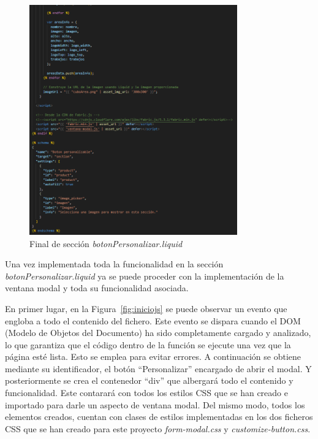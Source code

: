 \documentclass[12pt]{article}
\begin{document}
\begin{figure}[ht]
    \centering
    \includegraphics[width=0.8\textwidth]{imagenesUS3-section/finalSeccion.png}
    \caption{\label{fig:finalSeccion} Final de sección \textit{botonPersonalizar.liquid}}
    \vspace{\fill}
\end{figure}

Una vez implementada toda la funcionalidad en la sección \textit{botonPersonalizar.liquid} ya se puede proceder con la implementación de la ventana
modal y toda su funcionalidad asociada.

En primer lugar, en la Figura~\ref{fig:iniciojs} se puede observar un evento que engloba a todo el contenido del fichero. Este evento se dispara cuando el DOM (Modelo de Objetos del Documento) ha 
sido completamente cargado y analizado, lo que garantiza que el código dentro de la función se ejecute una vez que la página esté lista. Esto se emplea para evitar errores.
A continuación se obtiene mediante su identificador, el botón ``Personalizar'' encargado de abrir el modal. Y posteriormente se crea el contenedor ``div'' que albergará 
todo el contenido y funcionalidad. Este contarará con todos los estilos CSS que se han creado e importado para darle un aspecto de ventana modal. Del mismo modo, todos los elementos
creados, cuentan con clases de estilos implementadas en los dos ficheros CSS que se han creado para este proyecto \textit{form-modal.css} y \textit{customize-button.css}.
\end{document}
